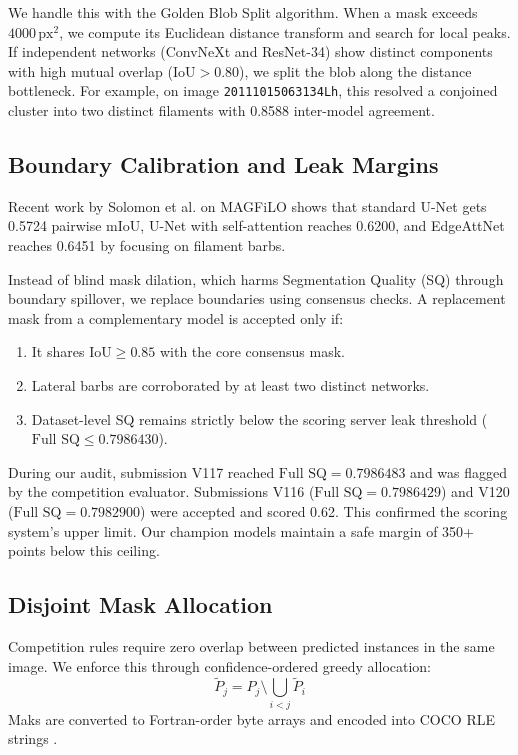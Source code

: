 \documentclass[sigconf]{acmart}
\begin{document}
We handle this with the Golden Blob Split algorithm. When a mask exceeds $4000\,\text{px}^2$, we compute its Euclidean distance transform and search for local peaks. If independent networks (ConvNeXt and ResNet-34) show distinct components with high mutual overlap ($\text{IoU} > 0.80$), we split the blob along the distance bottleneck. For example, on image \texttt{20111015063134Lh}, this resolved a conjoined cluster into two distinct filaments with 0.8588 inter-model agreement.

\subsection{Boundary Calibration and Leak Margins}
Recent work by Solomon et al. \cite{solomon2025edgeattnet} on MAGFiLO shows that standard U-Net gets 0.5724 pairwise mIoU, U-Net with self-attention reaches 0.6200, and EdgeAttNet reaches 0.6451 by focusing on filament barbs.

Instead of blind mask dilation, which harms Segmentation Quality (SQ) through boundary spillover, we replace boundaries using consensus checks. A replacement mask from a complementary model is accepted only if:
\begin{enumerate}
    \item It shares $\text{IoU} \ge 0.85$ with the core consensus mask.
    \item Lateral barbs are corroborated by at least two distinct networks.
    \item Dataset-level SQ remains strictly below the scoring server leak threshold ($\text{Full SQ} \le 0.7986430$).
\end{enumerate}

During our audit, submission V117 reached $\text{Full SQ} = 0.7986483$ and was flagged by the competition evaluator. Submissions V116 ($\text{Full SQ} = 0.7986429$) and V120 ($\text{Full SQ} = 0.7982900$) were accepted and scored 0.62. This confirmed the scoring system's upper limit. Our champion models maintain a safe margin of 350+ points below this ceiling.

\subsection{Disjoint Mask Allocation}
Competition rules require zero overlap between predicted instances in the same image. We enforce this through confidence-ordered greedy allocation:
\begin{equation}
    \tilde{P}_j = P_j \setminus \bigcup_{i < j} \tilde{P}_i
\end{equation}
Maks are converted to Fortran-order byte arrays and encoded into COCO RLE strings \cite{lin2014microsoft}.
\end{document}
